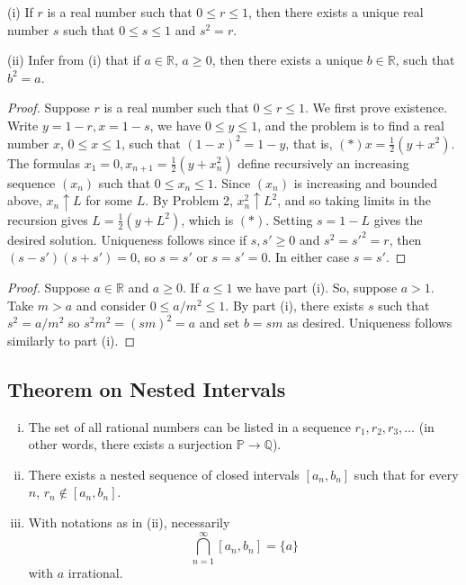 \begin{tcolorbox}[title=Problem 9, breakable]
    (i) If $r$ is a real number such that $0 \le r \le 1$,
    then there exists a unique real number $s$ such that $0 \le s \le 1$
    and $s^2 = r$.

    (ii) Infer from (i) that if $a \in \mathbb{R}$,
    $a \ge 0$, then there exists a unique $b \in \mathbb{R}$,
    such that $b^2 = a$.
\end{tcolorbox}

\begin{proof}
    Suppose $r$ is a real number such that $0 \le r \le 1$.
    We first prove existence.
    Write $y = 1 - r, x = 1 - s$, we have $0 \le y \le 1$,
        and the problem is to find a real number $x$, $0 \le x \le 1$,
        such that $(1 - x)^2 = 1 - y$, that is, $(*) x = \frac{1}{2}(y + x^2)$.
    The formulas $x_1 = 0, x_{n + 1} = \frac{1}{2}(y + x_n^2)$ define recursively an
        increasing sequence $(x_n)$ such that $0 \le x_n \le 1$.
    Since $(x_n)$ is increasing and bounded above, $x_n \uparrow L$ for some $L$.
    By Problem 2, $x_n^2 \uparrow L^2$,
        and so taking limits in the recursion gives $L = \frac{1}{2}(y + L^2)$,
        which is $(*)$. Setting $s = 1 - L$ gives the desired solution.
    Uniqueness follows since if $s, s' \ge 0$ and $s^2 = s'^2 = r$, then
    $(s - s')(s + s') = 0$, so $s = s'$ or $s = s' = 0$. In either case $s = s'$.
\end{proof}

\begin{proof}
    Suppose $a \in \mathbb{R}$ and $a \ge 0$.
    If $a \le 1$ we have part (i). So, suppose $a > 1$.
    Take $m > a$ and consider $0 \le a/m^2 \le 1$.
    By part (i), there exists $s$ such that $s^2 = a/m^2$ so $s^2 m^2 = (sm)^2 = a$ 
        and set $b = sm$ as desired.    
    Uniqueness follows similarly to part (i).
\end{proof}

\subsection{Theorem on Nested Intervals}

\begin{tcolorbox}[title=Problem 1, breakable]
    \begin{enumerate}[(i)]
        \item The set of all rational numbers can be listed in a sequence
            $r_1, r_2, r_3, \ldots$ (in other words, there exists a surjection $\mathbb{P} \to \mathbb{Q}$).
        \item There exists a nested sequence of closed intervals $[a_n, b_n]$ such that
            for every $n$, $r_n \notin [a_n, b_n]$.
        \item With notations as in (ii), necessarily
            \[
                \bigcap_{n=1}^{\infty} [a_n, b_n] = \{a\}
            \]
            with $a$ irrational.
    \end{enumerate}
\end{tcolorbox}

